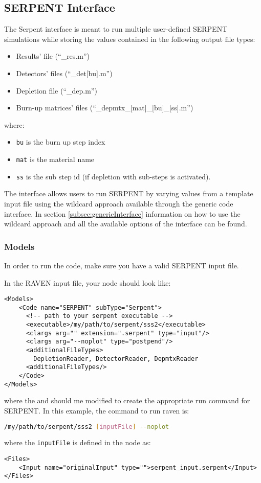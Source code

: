
\subsection{SERPENT Interface}
\label{subsec:serpentInterface}
The Serpent interface is meant to run multiple user-defined SERPENT simulations
while storing the values contained in the following output file types: 
\begin{itemize}
\item Results' file (``\_res.m'')
\item Detectors' files  (``\_det[bu].m'')
\item Depletion file (``\_dep.m'')
\item Burn-up matrices' files (``\_depmtx\_[mat]\_[bu]\_[ss].m'')
\end{itemize}

where:
\begin{itemize}
\item  \texttt{bu} is the burn up step index
\item  \texttt{mat} is the material name
\item  \texttt{ss} is the sub step id (if depletion with sub-steps is activated).
\end{itemize}

The interface allows users to run SERPENT by varying values from a 
template input file using the wildcard approach available through the
generic code interface. In section \ref{subsec:genericInterface}  information
on how to use the wildcard approach and all the available options of the interface
can be found.

\subsubsection{Models}
\label{subsubsec:serpentInterfaceModels}
In order to run the code, make sure you have a valid SERPENT input file.

In the RAVEN input file, your  node should look like:
\begin{lstlisting}[style=XML]
<Models>
    <Code name="SERPENT" subType="Serpent">
      <!-- path to your serpent executable -->
      <executable>/my/path/to/serpent/sss2</executable>
      <clargs arg="" extension=".serpent" type="input"/>
      <clargs arg="--noplot" type="postpend"/>
      <additionalFileTypes>
        DepletionReader, DetectorReader, DepmtxReader
      <additionalFileTypes/>
    </Code>
</Models>
\end{lstlisting}
where the  and  should me modified
to create the appropriate run command for SERPENT. In this example, the command
to run raven is:
\begin{lstlisting}[language=bash]
/my/path/to/serpent/sss2 [inputFile] --noplot
\end{lstlisting}
where the \texttt{inputFile} is defined in the  node as:
\begin{lstlisting}[style=XML]
<Files>
    <Input name="originalInput" type="">serpent_input.serpent</Input>
</Files>
\end{lstlisting}

